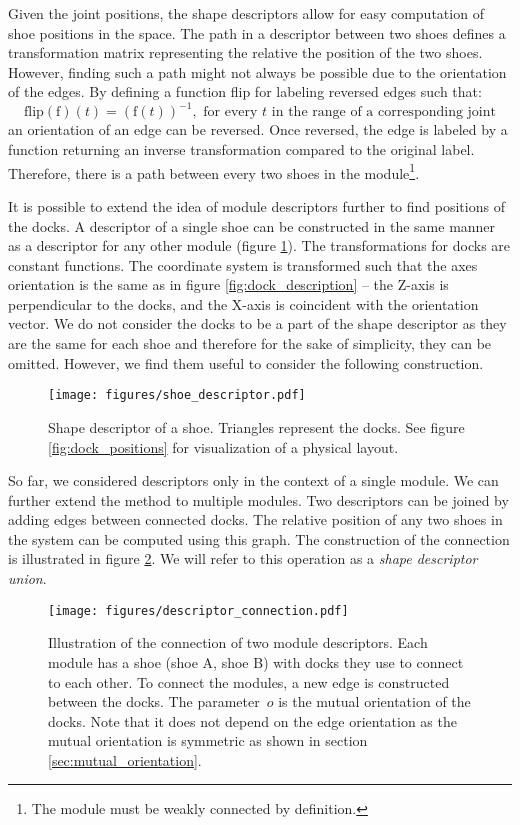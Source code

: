 Given the joint positions, the shape descriptors allow for easy computation of
shoe positions in the space. The path in a descriptor between two shoes defines
a transformation matrix representing the relative the position of the two shoes.
However, finding such a path might not always be possible due to the orientation
of the edges. By defining a function flip for labeling reversed edges such that:
\[\text{flip}(\text{f})(t) = (\text{f}(t))^{-1}, \text{ for every } t \text{ in
the range of a corresponding joint}\] an orientation of an edge can be reversed.
Once reversed, the edge is labeled by a function returning an inverse
transformation compared to the original label. Therefore, there is a path
between every two shoes in the module\footnote{The module must be weakly
connected by definition.}.

It is possible to extend the idea of module descriptors further to find
positions of the docks. A descriptor of a single shoe can be constructed in the
same manner as a descriptor for any other module (figure
\ref{fig:shoe_descriptor}). The transformations for docks are constant
functions. The coordinate system is transformed such that the axes orientation
is the same as in figure \ref{fig:dock_description} -- the Z-axis is
perpendicular to the docks, and the X-axis is coincident with the orientation
vector. We do not consider the docks to be a part of the shape descriptor as
they are the same for each shoe and therefore for the sake of simplicity, they
can be omitted. However, we find them useful to consider the following
construction.

\begin{figure}[t]
    \centering
    \texttt{[image: figures/shoe\_descriptor.pdf]}
    \caption{Shape descriptor of a shoe. Triangles represent the docks. See
    figure
    \ref{fig:dock_positions} for visualization of a physical layout.}
    \label{fig:shoe_descriptor}
\end{figure}

So far, we considered descriptors only in the context of a single module. We can
further extend the method to multiple modules. Two descriptors can be joined by
adding edges between connected docks. The relative position of any two shoes in
the system can be computed using this graph. The construction of the connection
is illustrated in figure \ref{fig:connection_descriptor}. We will refer to this
operation as a \emph{shape descriptor union}.

\begin{figure}[t]
    \centering
    \texttt{[image: figures/descriptor\_connection.pdf]}
    \caption{Illustration of the connection of two module descriptors. Each
    module has a shoe (shoe A, shoe B) with docks they use to connect to each
    other. To connect the modules, a new edge is constructed between the docks.
    The parameter~$o$ is the mutual orientation of the docks. Note that it does
    not depend on the edge orientation as the mutual orientation is symmetric as
    shown in section \ref{sec:mutual_orientation}. }
    \label{fig:connection_descriptor}
\end{figure}

